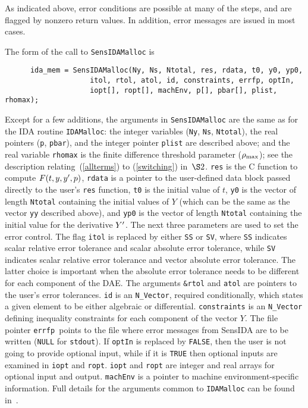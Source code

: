\vspace{.1 in}

As indicated above, error conditions are possible at many of the
steps, and are flagged by nonzero return values.  In addition, error
messages are issued in most cases.

The form of the call to {\tt SensIDAMalloc} is 
\begin{verbatim}
      ida_mem = SensIDAMalloc(Ny, Ns, Ntotal, res, rdata, t0, y0, yp0, 
                    itol, rtol, atol, id, constraints, errfp, optIn, 
                    iopt[], ropt[], machEnv, p[], pbar[], plist, rhomax); 
\end{verbatim}
Except for a few additions, the arguments in {\tt SensIDAMalloc} are
the same as for the IDA routine {\tt IDAMalloc}:
the integer variables ({\tt Ny},
{\tt Ns}, {\tt Ntotal}), the real pointers ({\tt p}, {\tt pbar}), and
the integer pointer {\tt plist}
are described above; and the real variable {\tt rhomax} is the
finite difference threshold parameter ($\rho_{\max}$); see the
description relating~(\ref{allterms}) to (\ref{switching}) in~$\S2$.
{\tt res} is the C function to compute $F(t,y,y^{\prime},p)$,
{\tt rdata} is a pointer to the user-defined data block passed
directly to the user's {\tt res} function,
{\tt t0} is the initial value of $t$,
{\tt y0} is the vector of length {\tt Ntotal} containing the initial values
of $Y$ (which can be the same as the vector {\tt yy} described above),
and {\tt yp0} is the vector of length {\tt Ntotal} containing the
initial value for the derivative $Y^{\prime}$.
The next three parameters are used to set the error control.
The flag {\tt itol} is replaced by either {\tt SS} or {\tt SV}, where
{\tt SS} indicates scalar relative error tolerance and scalar absolute
error tolerance, while {\tt SV} indicates scalar relative error
tolerance and vector absolute error tolerance.
The latter choice is important when the absolute error tolerance needs
to be different for each component of the DAE.
The arguments {\tt \&rtol} and {\tt atol} are pointers to the user's
error tolerances.
{\tt id} is an {\tt N\_Vector}, required conditionally, which states a
given element to be either algebraic or differential.
{\tt constraints} is an {\tt N\_Vector} defining inequality
constraints for each component of the vector $Y$.
The file pointer {\tt errfp }points to the file where error messages
from SensIDA are to be written ({\tt NULL} for {\tt stdout}).
If {\tt optIn} is replaced by {\tt FALSE}, then the user is not going
to provide optional input, while if it is {\tt TRUE} then optional
inputs are examined in {\tt iopt} and {\tt ropt}.
{\tt iopt} and {\tt ropt} are integer and real arrays for optional
input and output.
{\tt machEnv} is a pointer to machine environment-specific
information.
Full details for the arguments common to {\tt IDAMalloc} can be found
in~\cite{IDA_UG}.

